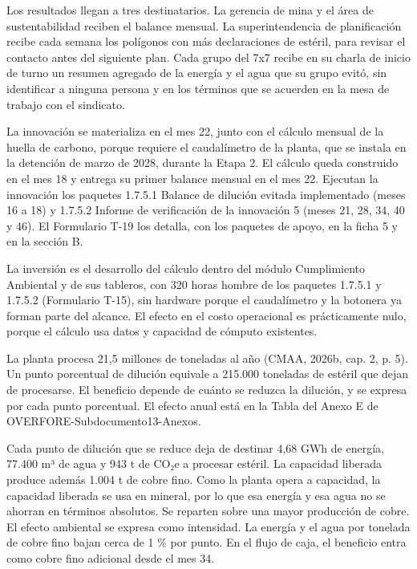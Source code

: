 \documentclass[subdoc]{../../comun/overfore}
\begin{document}
Los resultados llegan a tres destinatarios. La gerencia de mina y el área de sustentabilidad reciben el balance mensual. La superintendencia de planificación recibe cada semana los polígonos con más declaraciones de estéril, para revisar el contacto antes del siguiente plan. Cada grupo del 7x7 recibe en su charla de inicio de turno un resumen agregado de la energía y el agua que su grupo evitó, sin identificar a ninguna persona y en los términos que se acuerden en la mesa de trabajo con el sindicato.

La innovación se materializa en el mes 22, junto con el cálculo mensual de la huella de carbono, porque requiere el caudalímetro de la planta, que se instala en la detención de marzo de 2028, durante la Etapa 2. El cálculo queda construido en el mes 18 y entrega su primer balance mensual en el mes 22. Ejecutan la innovación los paquetes 1.7.5.1 Balance de dilución evitada implementado (meses 16 a 18) y 1.7.5.2 Informe de verificación de la innovación 5 (meses 21, 28, 34, 40 y 46). El Formulario T-19 los detalla, con los paquetes de apoyo, en la ficha 5 y en la sección B.

La inversión es el desarrollo del cálculo dentro del módulo Cumplimiento Ambiental y de sus tableros, con 320 horas hombre de los paquetes 1.7.5.1 y 1.7.5.2 (Formulario T-15), sin hardware porque el caudalímetro y la botonera ya forman parte del alcance. El efecto en el costo operacional es prácticamente nulo, porque el cálculo usa datos y capacidad de cómputo existentes.

La planta procesa 21,5 millones de toneladas al año (CMAA, 2026b, cap. 2, p. 5). Un punto porcentual de dilución equivale a 215.000 toneladas de estéril que dejan de procesarse. El beneficio depende de cuánto se reduzca la dilución, y se expresa por cada punto porcentual. El efecto anual está en la Tabla  del Anexo E de OVERFORE-Subdocumento13-Anexos.

Cada punto de dilución que se reduce deja de destinar 4,68 GWh de energía, 77.400 m³ de agua y 943 t de CO₂e a procesar estéril. La capacidad liberada produce además 1.004 t de cobre fino. Como la planta opera a capacidad, la capacidad liberada se usa en mineral, por lo que esa energía y esa agua no se ahorran en términos absolutos. Se reparten sobre una mayor producción de cobre. El efecto ambiental se expresa como intensidad. La energía y el agua por tonelada de cobre fino bajan cerca de 1 \% por punto. En el flujo de caja, el beneficio entra como cobre fino adicional desde el mes 34.
\end{document}
